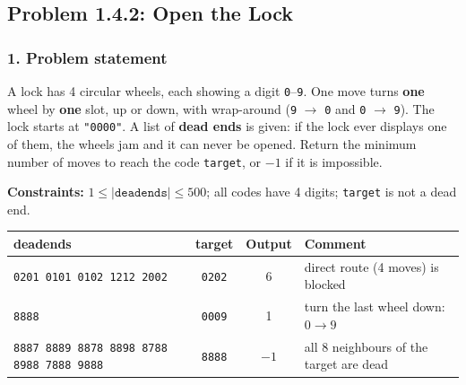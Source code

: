 \subsection{Problem 1.4.2: Open the Lock}


\subsubsection*{1. Problem statement}

A lock has 4 circular wheels, each showing a digit \texttt{0}--\texttt{9}. One move turns \textbf{one} wheel by \textbf{one} slot, up or down, with wrap-around (\texttt{9} $\to$ \texttt{0} and \texttt{0} $\to$ \texttt{9}). The lock starts at \texttt{"0000"}. A list of \textbf{dead ends} is given: if the lock ever displays one of them, the wheels jam and it can never be opened. Return the minimum number of moves to reach the code \texttt{target}, or $-1$ if it is impossible.

\textbf{Constraints:} $1 \le |\texttt{deadends}| \le 500$; all codes have 4 digits; \texttt{target} is not a dead end.

\begin{table}[H]
\centering\small
\begin{tabular}{@{}p{5.6cm}ccp{5.6cm}@{}}
\toprule
\textbf{deadends} & \textbf{target} & \textbf{Output} & \textbf{Comment} \\
\midrule
\texttt{0201 0101 0102 1212 2002} & \texttt{0202} & 6 & direct route (4 moves) is blocked \\
\texttt{8888} & \texttt{0009} & 1 & turn the last wheel down: $0 \to 9$ \\
\texttt{8887 8889 8878 8898 8788 8988 7888 9888} & \texttt{8888} & $-1$ & all 8 neighbours of the target are dead \\
\bottomrule
\end{tabular}
\end{table}

